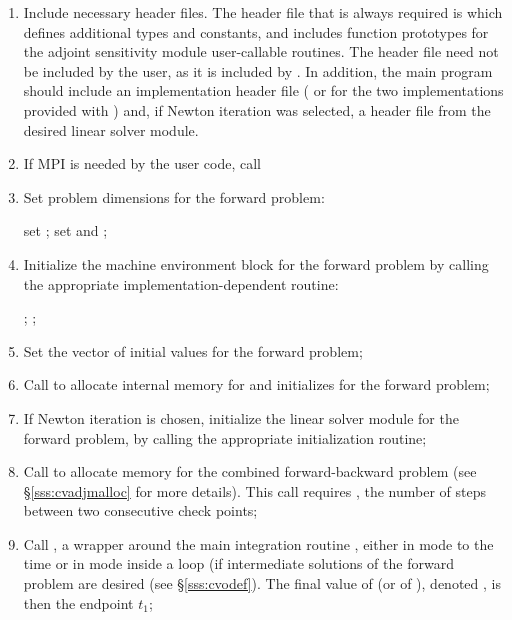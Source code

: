 \begin{enumerate}

\item
  Include necessary header files. The header file that is always required
  is  which defines additional types and constants, and includes
  function prototypes for the adjoint sensitivity module user-callable routines.
  The header file  need not be included by the user, as it is included 
  by . In addition, the main program should include an {\nvector} 
  implementation header file ( or 
  for the two implementations provided with {\cvodes}) and, if Newton iteration 
  was selected, a header file from the desired linear solver module.

\item
  {\p} If MPI is needed by the user code, call 

\item
  Set problem dimensions for the forward problem:

  {\s} set ; {\p} set  and ;

\item
  Initialize the machine environment block for the forward problem by calling 
  the appropriate implementation-dependent {\nvector} routine:

  {\s} ; {\p} ;

\item
  Set the vector  of initial values for the forward problem; 

\item
  Call \id{()} to allocate internal memory for 
  {\cvodes} and initializes {\cvodes} for the forward problem;

\item
  If Newton iteration is chosen, initialize the linear solver module 
  for the forward problem, by calling the appropriate initialization routine;

\item
  Call \id{()} to allocate memory for the 
  combined forward-backward problem (see \S\ref{sss:cvadjmalloc} for more details). 
  This call requires , the number of steps between two consecutive check points;

\item
  Call , a wrapper around the {\cvodes} main integration
  routine , either in  mode to the time 
   or in  mode inside a loop (if intermediate
  solutions of the forward problem are desired (see \S\ref{sss:cvodef}).
  The final value of  (or of ), denoted , is then
  the endpoint $t_1$;


\end{enumerate}
